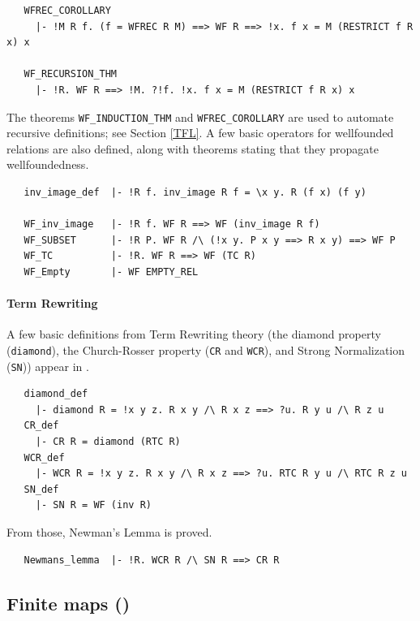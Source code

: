 {\begin{hol}
\begin{verbatim}
   WFREC_COROLLARY
     |- !M R f. (f = WFREC R M) ==> WF R ==> !x. f x = M (RESTRICT f R x) x

   WF_RECURSION_THM
     |- !R. WF R ==> !M. ?!f. !x. f x = M (RESTRICT f R x) x
\end{verbatim}
\end{hol}

\noindent The theorems {\small\verb+WF_INDUCTION_THM+} and
{\small\verb+WFREC_COROLLARY+} are used to automate recursive
definitions; see Section \ref{TFL}. A few basic operators for
wellfounded relations are also defined, along with theorems stating
that they propagate wellfoundedness.

\begin{hol}
\begin{verbatim}
   inv_image_def  |- !R f. inv_image R f = \x y. R (f x) (f y)

   WF_inv_image   |- !R f. WF R ==> WF (inv_image R f)
   WF_SUBSET      |- !R P. WF R /\ (!x y. P x y ==> R x y) ==> WF P
   WF_TC          |- !R. WF R ==> WF (TC R)
   WF_Empty       |- WF EMPTY_REL
\end{verbatim}
\end{hol}

\paragraph {Term Rewriting}

A few basic definitions from Term Rewriting theory
(the diamond property (\verb+diamond+), the Church-Rosser
property ({\small\verb+CR+} and {\small\verb+WCR+}), and Strong
Normalization ({\small\verb+SN+})) appear
in .
%
\begin{hol}
\begin{verbatim}
   diamond_def
     |- diamond R = !x y z. R x y /\ R x z ==> ?u. R y u /\ R z u
   CR_def
     |- CR R = diamond (RTC R)
   WCR_def
     |- WCR R = !x y z. R x y /\ R x z ==> ?u. RTC R y u /\ RTC R z u
   SN_def
     |- SN R = WF (inv R)
\end{verbatim}
\end{hol}
%
From those, Newman's Lemma is proved.
%
\begin{hol}
\begin{verbatim}
   Newmans_lemma  |- !R. WCR R /\ SN R ==> CR R
\end{verbatim}
\end{hol}

\subsection{Finite maps ()}\label{finite_map}

}
